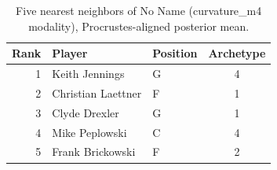 \begin{table}[htbp]
  \centering\small
  \begin{tabular}{rllc}
    \toprule
    Rank & Player & Position & Archetype \\
    \midrule
    1 & Keith Jennings & G & 4 \\
    2 & Christian Laettner & F & 1 \\
    3 & Clyde Drexler & G & 1 \\
    4 & Mike Peplowski & C & 4 \\
    5 & Frank Brickowski & F & 2 \\
    \bottomrule
  \end{tabular}
  \caption{Five nearest neighbors of No Name (curvature_m4 modality), Procrustes-aligned posterior mean.}
  \label{tab:No_Name_neighbors_curvature_m4}
\end{table}


